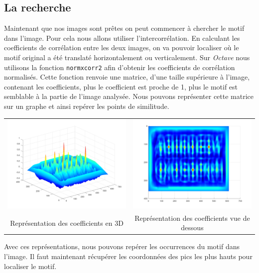 \documentclass[a4paper,12pt,titlepage]{report}
\newcommand{\octave}{\textit{Octave }}
\begin{document}
	\subsection{La recherche}
	Maintenant que nos images sont prêtes on peut commencer à chercher le motif dans l'image. Pour cela nous allons utiliser l'intercorrélation. En calculant les coefficients de corrélation entre les deux images, on va pouvoir localiser où le motif original a été translaté horizontalement ou verticalement.
	Sur \octave nous utilisons la fonction \texttt{normxcorr2} afin d'obtenir les coefficients de corrélation normalisés. Cette fonction renvoie une matrice, d'une taille supérieure à l'image, contenant les coefficients, plus le coefficient est proche de 1, plus le motif est semblable à la partie de l'image analysée.
	Nous pouvons représenter cette matrice sur un graphe et ainsi repérer les points de similitude.\\
	\begin{tabular}{|c|c|}
			\includegraphics[scale=0.18]{illus/cor.png} & \includegraphics[scale=0.18]{illus/cor1.png}\\
			Représentation des coefficients en 3D  & Représentation des coefficients vue de dessous\\
	\end{tabular}
	Avec ces représentations, nous pouvons repérer les occurrences du motif dans l'image. Il faut maintenant récupérer les coordonnées des pics les plus hauts pour localiser le motif.
\end{document}
